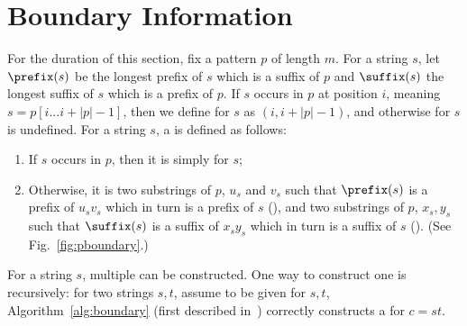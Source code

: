  
\section{Boundary Information}
For the duration of this section, fix a pattern $p$ of length $m$. 
For a string $s$, let $\prefix(s)$ be the longest prefix of $s$ which is a suffix of $p$ and $\suffix(s)$ the longest suffix of $s$ which is a prefix of $p$. 
%
If $s$ occurs in $p$ at position $i$, meaning $s=p[i...i+|p|-1]$, then we define \emph{} for $s$ as $(i,i+|p|-1)$, and otherwise  for $s$ is undefined. 
%
For a string $s$, a \emph{} is defined as follows:
\begin{enumerate}
\item If $s$ occurs in $p$, then it is simply  for $s$;
\item Otherwise, it is two substrings of $p$, $u_s$ and $v_s$ such that $\prefix(s)$ is a prefix of $u_s v_s$ which in turn is a prefix of $s$ (\emph{}), and two substrings of $p$, $x_s, y_s$ such that $\suffix(s)$ is a suffix of $x_s y_s$ which in turn is a suffix of $s$ (\emph{}). (See Fig.~\ref{fig:pboundary}.)
\end{enumerate}


For a string $s$, multiple \emph{} can be constructed. One way to construct one is recursively: for two strings $s, t$, assume to be given  for $s, t$, Algorithm~\ref{alg:boundary} (first described in~\cite{DBLP:conf/soda/GanardiG22})  correctly constructs a  for $c=st$.

